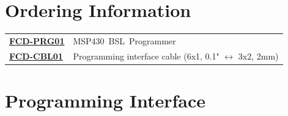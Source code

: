 \documentclass[10pt,letterpaper]{datasheet}
\newcommand{\mbp}{MSP430~BSL~Programmer}
\newcommand{\PIDNOLINK}{FCD\nobreakdash-PRG01}
\newcommand{\PID}{\href{http://www.flyingcampdesign.com/msp430-bsl-programmer.html}{\PIDNOLINK}}
\newcommand{\PIDCBLNOLINK}{FCD-CBL01}
\newcommand{\PIDCBL}{\href{http://www.flyingcampdesign.com/msp430-bsl-programmer.html}{\PIDCBLNOLINK}}
\begin{document}
\section*{Ordering Information}
\begin{flushleft}
  \label{tab:ordering}
  \begin{tabular}{l l}
    \textbf{\PID} & \mbp \\
    \textbf{\PIDCBL} & Programming interface cable (6x1, 0.1" $\leftrightarrow$ 3x2, 2mm) \\
  \end{tabular}
\end{flushleft}

\newpage

\section*{Programming Interface}
\end{document}
